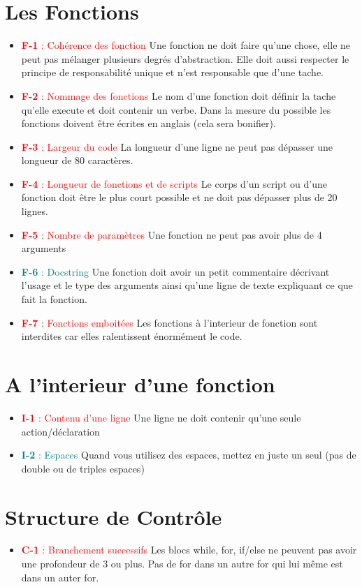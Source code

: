 \documentclass[12pt,fleqn]{report}
\begin{document}
\section{Les Fonctions}
\begin{itemize}
    \item \textcolor{red}{\textbf{F-1} : Cohérence des fonction} Une fonction ne doit faire qu'une chose, elle ne peut pas mélanger plusieurs degrés d'abstraction. Elle doit aussi respecter le principe de responsabilité unique et n'est responsable que d'une tache.
    \item \textcolor{red}{\textbf{F-2} : Nommage des fonctions} Le nom d'une fonction doit définir la tache qu'elle execute et doit contenir un verbe. Dans la mesure du possible les fonctions doivent être écrites en anglais (cela sera bonifier).
    \item \textcolor{red}{\textbf{F-3} : Largeur du code} La longueur d'une ligne ne peut pas dépasser une longueur de 80 caractères.
    \item \textcolor{red}{\textbf{F-4} : Longueur de fonctions et de scripts} Le corps d'un script ou d'une fonction doit être le plus court possible et ne doit pas dépasser plus de 20 lignes.
    \item \textcolor{red}{\textbf{F-5} : Nombre de paramètres} Une fonction ne peut pas avoir plus de 4 arguments
    \item \textcolor{teal}{\textbf{F-6} : Docstring} Une fonction doit avoir un petit commentaire décrivant l'usage et le type des arguments ainsi qu'une ligne de texte expliquant ce que fait la fonction.
    \item \textcolor{red}{\textbf{F-7} : Fonctions emboitées} Les fonctions à l'interieur de fonction sont interdites car elles ralentissent énormément le code. 
\end{itemize}

\section{A l'interieur d'une fonction}
\begin{itemize}
    \item \textcolor{red}{\textbf{I-1} : Contenu d'une ligne} Une ligne ne doit contenir qu'une seule action/déclaration
    \item \textcolor{teal}{\textbf{I-2} : Espaces} Quand vous utilisez des espaces, mettez en juste un seul (pas de double ou de triples espaces)
\end{itemize}

\section{Structure de Contrôle}
\begin{itemize}
    \item \textcolor{red}{\textbf{C-1} : Branchement successifs} Les blocs while, for, if/else ne peuvent pas avoir une profondeur de 3 ou plus. Pas de for dans un autre for qui lui même est dans un auter for.
    
\end{itemize}
\end{document}
